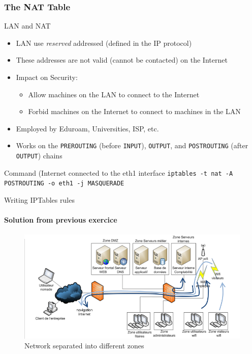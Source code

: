 \begin{reveals}
\begin{frame}
  \frametitle{The NAT Table}
  \vfill
  \begin{block}{LAN and NAT}
    \begin{itemize}
    \item LAN use \emph{reserved} addressed (defined in the IP
      protocol)
    \item These addresses are not valid (cannot be contacted) on the Internet
    \item Impact on Security:
      \begin{itemize}
      \item Allow machines on the LAN to connect to the Internet
      \item Forbid machines on the Internet to connect to machines in
        the LAN
      \end{itemize}
    \item Employed by Eduroam, Universities, ISP, etc.
    \item Works on the \texttt{PREROUTING} (before \texttt{INPUT}),
      \texttt{OUTPUT}, and \texttt{POSTROUTING} (after
      \texttt{OUTPUT}) chains
    \end{itemize}
  \end{block}
  \vfill
  \begin{block}{Command (Internet connected to the eth1 interface}
    \small\tt iptables -t nat -A POSTROUTING -o eth1 -j MASQUERADE
  \end{block}
\end{frame}

\begin{frame}[c]{Writing IPTables rules}
  \framesubtitle{Solution from previous exercice}

  \begin{figure}
  \centering
  \includegraphics[width=.9\textwidth]{images/reseau_securise.png}
  \caption{Network separated into different zones}
  \label{fig:reseau:securise}
\end{figure}


\end{frame}
\end{reveals}
